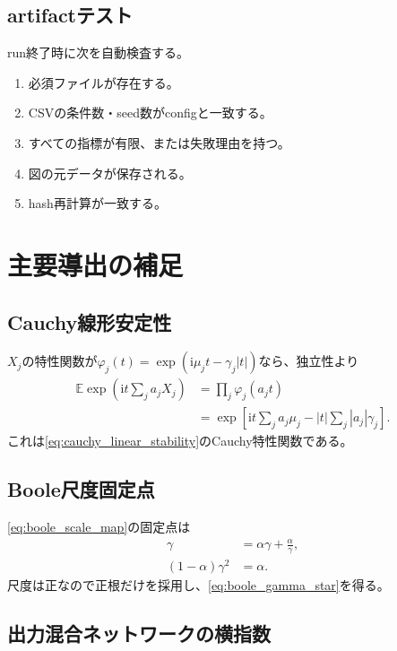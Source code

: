 \documentclass[a4paper,11pt,oneside,openany]{ltjsbook}
\newcommand{\E}{\mathbb{E}}
\newcommand{\ii}{\mathrm{i}}
\begin{document}
\section{artifactテスト}

run終了時に次を自動検査する。

\begin{enumerate}
  \item 必須ファイルが存在する。
  \item CSVの条件数・seed数がconfigと一致する。
  \item すべての指標が有限、または失敗理由を持つ。
  \item 図の元データが保存される。
  \item hash再計算が一致する。
\end{enumerate}

\chapter{主要導出の補足}
\label{app:derivations}

\section{Cauchy線形安定性}

\(X_j\)の特性関数が\(\varphi_j(t)=\exp(\ii\mu_jt-\gamma_j|t|)\)なら、独立性より
\begin{align}
  \E\exp\left(\ii t\sum_ja_jX_j\right)
  &=\prod_j\varphi_j(a_jt)\\
  &=\exp\left[
      \ii t\sum_ja_j\mu_j
      -|t|\sum_j|a_j|\gamma_j
    \right].
\end{align}
これは\cref{eq:cauchy_linear_stability}のCauchy特性関数である。

\section{Boole尺度固定点}

\cref{eq:boole_scale_map}の固定点は
\begin{align}
  \gamma&=\alpha\gamma+\frac{\alpha}{\gamma},\\
  (1-\alpha)\gamma^2&=\alpha.
\end{align}
尺度は正なので正根だけを採用し、\cref{eq:boole_gamma_star}を得る。

\section{出力混合ネットワークの横指数}
\end{document}
